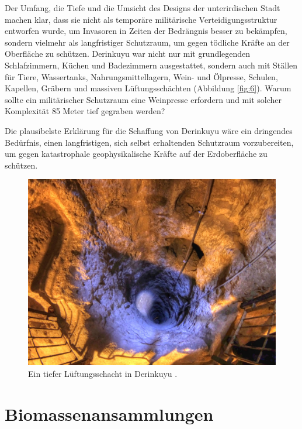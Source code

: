 \documentclass[10pt,twocolumn,letterpaper]{article}
\begin{document}
Der Umfang, die Tiefe und die Umsicht des Designs der unterirdischen Stadt machen klar, dass sie nicht als temporäre militärische Verteidigungsstruktur entworfen wurde, um Invasoren in Zeiten der Bedrängnis besser zu bekämpfen, sondern vielmehr als langfristiger Schutzraum, um gegen tödliche Kräfte an der Oberfläche zu schützen. Derinkuyu war nicht nur mit grundlegenden Schlafzimmern, Küchen und Badezimmern ausgestattet, sondern auch mit Ställen für Tiere, Wassertanks, Nahrungsmittellagern, Wein- und Ölpresse, Schulen, Kapellen, Gräbern und massiven Lüftungsschächten (Abbildung \ref{fig:6}). Warum sollte ein militärischer Schutzraum eine Weinpresse erfordern und mit solcher Komplexität 85 Meter tief gegraben werden?

Die plausibelste Erklärung für die Schaffung von Derinkuyu wäre ein dringendes Bedürfnis, einen langfristigen, sich selbst erhaltenden Schutzraum vorzubereiten, um gegen katastrophale geophysikalische Kräfte auf der Erdoberfläche zu schützen.

\begin{figure}[t]
\begin{center}
   \includegraphics[width=1\linewidth]{derinkuyu-air.jpg}
\end{center}
   \caption{Ein tiefer Lüftungsschacht in Derinkuyu \cite{53}.}
\label{fig:6}
\label{fig:onecol}
\end{figure}

\section{Biomassenansammlungen}
\end{document}
